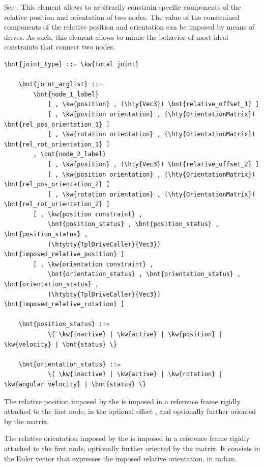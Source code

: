 See \cite{MASARATI-TOTALJ}.
This element allows to arbitrarily constrain specific components
of the relative position and orientation of two nodes.
The value of the constrained components of the relative position
and orientation can be imposed by means of drives.
As such, this element allows to mimic the behavior of most
ideal constraints that connect two nodes.
\begin{Verbatim}[commandchars=\\\{\}]
    \bnt{joint_type} ::= \kw{total joint}

    \bnt{joint_arglist} ::=
        \bnt{node_1_label}
            [ , \kw{position} , (\hty{Vec3}) \bnt{relative_offset_1} ]
            [ , \kw{position orientation} , (\hty{OrientationMatrix}) \bnt{rel_pos_orientation_1} ]
            [ , \kw{rotation orientation} , (\hty{OrientationMatrix}) \bnt{rel_rot_orientation_1} ]
        , \bnt{node_2_label}
            [ , \kw{position} , (\hty{Vec3}) \bnt{relative_offset_2} ]
            [ , \kw{position orientation} , (\hty{OrientationMatrix}) \bnt{rel_pos_orientation_2} ]
            [ , \kw{rotation orientation} , (\hty{OrientationMatrix}) \bnt{rel_rot_orientation_2} ]
        [ , \kw{position constraint} ,
            \bnt{position_status} , \bnt{position_status} , \bnt{position_status} ,
            (\htybty{TplDriveCaller}{Vec3}) \bnt{imposed_relative_position} ]
        [ , \kw{orientation constraint} ,
            \bnt{orientation_status} , \bnt{orientation_status} , \bnt{orientation_status} ,
            (\htybty{TplDriveCaller}{Vec3}) \bnt{imposed_relative_rotation} ]

    \bnt{position_status} ::=
            \{ \kw{inactive} | \kw{active} | \kw{position} | \kw{velocity} | \bnt{status} \}

    \bnt{orientation_status} ::=
            \{ \kw{inactive} | \kw{active} | \kw{rotation} | \kw{angular velocity} | \bnt{status} \}
\end{Verbatim}
The relative position imposed by the 
is imposed in a reference frame rigidly attached to the first node,
in the optional offset ,
and optionally further oriented by the 
matrix.

The relative orientation imposed by the 
is imposed in a reference frame rigidly attached to the first node,
optionally further oriented by the 
matrix.
It consists in the Euler vector that expresses
the imposed relative orientation, in radian.


